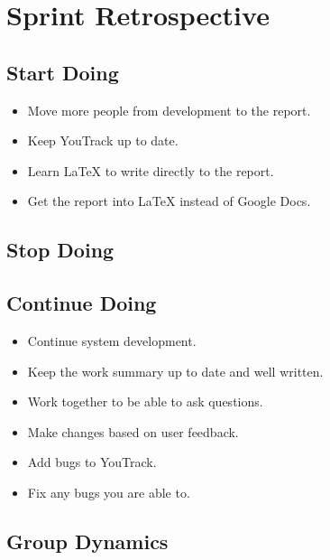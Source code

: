 \section{Sprint Retrospective}
\label{sec:S4Retrospective}


\subsection{Start Doing}
\label{subsec:S4RetrospectiveStart}

\begin{itemize}
   \item Move more people from development to the report.
   \item Keep YouTrack up to date.
   \item Learn LaTeX to write directly to the report.
   \item Get the report into LaTeX instead of Google Docs.
\end{itemize}

\subsection{Stop Doing}
\label{subsec:S4RetrospectiveStop}

\subsection{Continue Doing}
\label{subsec:S4RetrospectiveContinue}

\begin{itemize}
    \item Continue system development.
    \item Keep the work summary up to date and well written.
    \item Work together to be able to ask questions.
    \item Make changes based on user feedback.
    \item Add bugs to YouTrack.
    \item Fix any bugs you are able to.
\end{itemize}

\subsection{Group Dynamics}
\label{subsec:S4RetrospectiveGroupDynamics}

